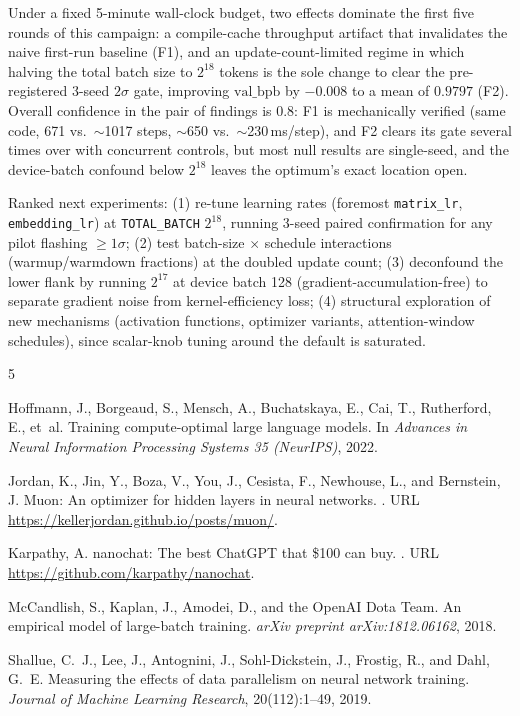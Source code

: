 \documentclass{article}
\newcommand{\valbpb}{\mathrm{val\_bpb}}
\begin{document}
Under a fixed 5-minute wall-clock budget, two effects dominate the first five rounds of this campaign: a compile-cache throughput artifact that invalidates the naive first-run baseline (F1), and an update-count-limited regime in which halving the total batch size to $2^{18}$ tokens is the sole change to clear the pre-registered 3-seed $2\sigma$ gate, improving $\valbpb$ by $-0.008$ to a mean of $0.9797$ (F2). Overall confidence in the pair of findings is $0.8$: F1 is mechanically verified (same code, 671 vs.\ $\sim$1017 steps, $\sim$650 vs.\ $\sim$230\,ms/step), and F2 clears its gate several times over with concurrent controls, but most null results are single-seed, and the device-batch confound below $2^{18}$ leaves the optimum's exact location open.

Ranked next experiments: (1) re-tune learning rates (foremost \texttt{matrix\_lr}, \texttt{embedding\_lr}) at \texttt{TOTAL\_BATCH} $2^{18}$, running 3-seed paired confirmation for any pilot flashing $\geq 1\sigma$; (2) test batch-size $\times$ schedule interactions (warmup/warmdown fractions) at the doubled update count; (3) deconfound the lower flank by running $2^{17}$ at device batch 128 (gradient-accumulation-free) to separate gradient noise from kernel-efficiency loss; (4) structural exploration of new mechanisms (activation functions, optimizer variants, attention-window schedules), since scalar-knob tuning around the default is saturated.



\begin{thebibliography}{5}

Hoffmann, J., Borgeaud, S., Mensch, A., Buchatskaya, E., Cai, T., Rutherford, E., et~al.
\newblock Training compute-optimal large language models.
\newblock In \emph{Advances in Neural Information Processing Systems 35 (NeurIPS)}, 2022.

Jordan, K., Jin, Y., Boza, V., You, J., Cesista, F., Newhouse, L., and Bernstein, J.
\newblock Muon: An optimizer for hidden layers in neural networks.
.
\newblock URL \url{https://kellerjordan.github.io/posts/muon/}.

Karpathy, A.
\newblock nanochat: The best ChatGPT that \$100 can buy.
.
\newblock URL \url{https://github.com/karpathy/nanochat}.

McCandlish, S., Kaplan, J., Amodei, D., and the OpenAI Dota Team.
\newblock An empirical model of large-batch training.
\newblock \emph{arXiv preprint arXiv:1812.06162}, 2018.

Shallue, C.~J., Lee, J., Antognini, J., Sohl-Dickstein, J., Frostig, R., and Dahl, G.~E.
\newblock Measuring the effects of data parallelism on neural network training.
\newblock \emph{Journal of Machine Learning Research}, 20(112):1--49, 2019.

\end{thebibliography}
\end{document}
